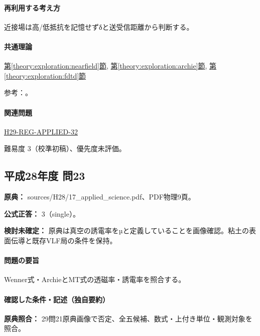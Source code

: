 \paragraph{再利用する考え方} 近接場は高/低抵抗を記憶せずδと送受信距離から判断する。

\paragraph{共通理論} \hyperref[theory:exploration:nearfield]{第\ref*{theory:exploration:nearfield}節}, \hyperref[theory:exploration:archie]{第\ref*{theory:exploration:archie}節}, \hyperref[theory:exploration:fdtd]{第\ref*{theory:exploration:fdtd}節}

\par 参考：\cite{usgs_csamt2012,epa_ip,epa_tdem_archive,epa_borehole_resistivity}。

\paragraph{関連問題} \hyperref[q:h29-reg-applied-32]{H29-REG-APPLIED-32}

\par 難易度 3（校準初稿）、優先度未評価。

\subsection{平成28年度 問23}
\label{q:h28-reg-applied-23}

\noindent\textbf{原典：} sources/H28/17\_applied\_science.pdf、PDF物理9頁。

\textbf{公式正答：} 3（single）。

\par\textbf{検討未確定：} 原典は真空の誘電率をµと定義していることを画像確認。粘土の表面伝導と既存VLF局の条件を保持。

\paragraph{問題の要旨} Wenner式・ArchieとMT式の透磁率・誘電率を照合する。

\paragraph{確認した条件・記述（独自要約）}\mbox{}\par

\noindent\textbf{原典照合：} 29問21原典画像で否定、全五候補、数式・上付き単位・観測対象を照合。\par

